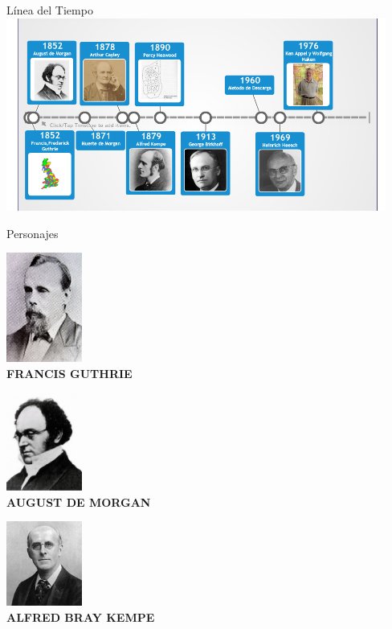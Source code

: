 \documentclass[spanish,utf8]{beamer}
\begin{document}
\begin{frame}{\insertsection}\transblindsvertical
Línea del Tiempo
\centering
\includegraphics[width=12.5cm]{linea.png}    
\end{frame}


\begin{frame}{Personajes}
\centering
\begin{minipage}[c]{3cm}
\includegraphics[width=2.5cm]{Francis_guthrie} \\
\centering \bf{FRANCIS GUTHRIE}
\end{minipage}
\begin{minipage}[c]{4cm}
\includegraphics[width=2.5cm]{morgan.jpg}\\
\centering\bf{AUGUST DE MORGAN}
\end{minipage}
\begin{minipage}[c]{3cm}
\includegraphics[width=2.5cm]{kempe.jpeg}\\
\centering\bf{ALFRED BRAY KEMPE}
\end{minipage}
\end{frame}
\end{document}
